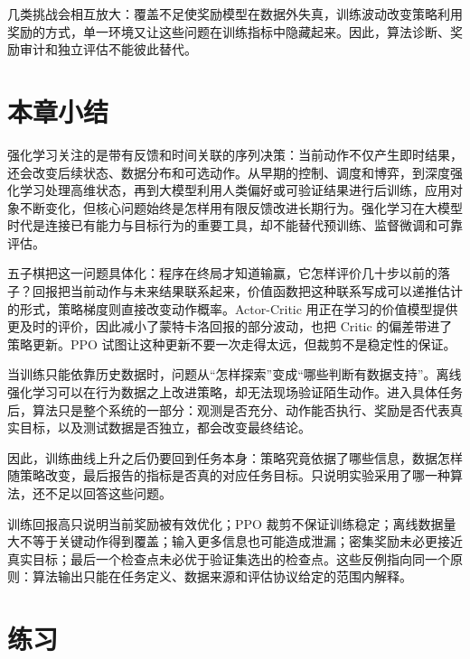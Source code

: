 \documentclass[UTF8,a4paper,zihao=-4,oneside,openany]{ctexbook}
\begin{document}
几类挑战会相互放大：覆盖不足使奖励模型在数据外失真，训练波动改变策略利用奖励的方式，单一环境又让这些问题在训练指标中隐藏起来。因此，算法诊断、奖励审计和独立评估不能彼此替代。

\section{本章小结}

强化学习关注的是带有反馈和时间关联的序列决策：当前动作不仅产生即时结果，还会改变后续状态、数据分布和可选动作。从早期的控制、调度和博弈，到深度强化学习处理高维状态，再到大模型利用人类偏好或可验证结果进行后训练，应用对象不断变化，但核心问题始终是怎样用有限反馈改进长期行为。强化学习在大模型时代是连接已有能力与目标行为的重要工具，却不能替代预训练、监督微调和可靠评估。

五子棋把这一问题具体化：程序在终局才知道输赢，它怎样评价几十步以前的落子？回报把当前动作与未来结果联系起来，价值函数把这种联系写成可以递推估计的形式，策略梯度则直接改变动作概率。Actor-Critic 用正在学习的价值模型提供更及时的评价，因此减小了蒙特卡洛回报的部分波动，也把 Critic 的偏差带进了策略更新。PPO 试图让这种更新不要一次走得太远，但裁剪不是稳定性的保证。

当训练只能依靠历史数据时，问题从“怎样探索”变成“哪些判断有数据支持”。离线强化学习可以在行为数据之上改进策略，却无法现场验证陌生动作。进入具体任务后，算法只是整个系统的一部分：观测是否充分、动作能否执行、奖励是否代表真实目标，以及测试数据是否独立，都会改变最终结论。

因此，训练曲线上升之后仍要回到任务本身：策略究竟依据了哪些信息，数据怎样随策略改变，最后报告的指标是否真的对应任务目标。只说明实验采用了哪一种算法，还不足以回答这些问题。

训练回报高只说明当前奖励被有效优化；PPO 裁剪不保证训练稳定；离线数据量大不等于关键动作得到覆盖；输入更多信息也可能造成泄漏；密集奖励未必更接近真实目标；最后一个检查点未必优于验证集选出的检查点。这些反例指向同一个原则：算法输出只能在任务定义、数据来源和评估协议给定的范围内解释。

\section*{练习}
\end{document}
